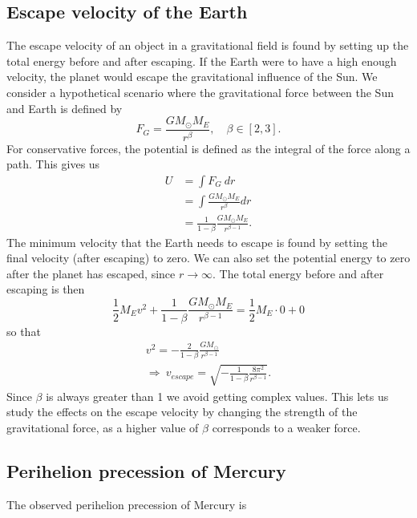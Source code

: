 \documentclass{emulateapj}
\begin{document}
\subsection{Escape velocity of the Earth}

The escape velocity of an object in a gravitational field is found by setting up the total energy before and after escaping. If the Earth were to have a high enough velocity, the planet would escape the gravitational influence of the Sun. We consider a hypothetical scenario where the gravitational force between the Sun and Earth is defined by
%
\begin{equation*}
    F_G = \frac{G M_\odot M_E}{r^\beta}, \quad \beta \in [2,3].
\end{equation*}
%
For conservative forces, the potential is defined as the integral of the force along a path. This gives us 
%
\begin{align*}
    U & = \int F_G \ dr \\
    & = \int \frac{G M_\odot M_E}{r^\beta} dr \\
    & = \frac{1}{1-\beta} \frac{G M_\odot M_E}{r^{\beta-1}}.
\end{align*}
%
The minimum velocity that the Earth needs to escape is found by setting the final velocity (after escaping) to zero. We can also set the potential energy to zero after the planet has escaped, since $r \rightarrow \infty$. The total energy before and after escaping is then 
%
\begin{equation*}
    \frac{1}{2}M_E v^2 + \frac{1}{1-\beta} \frac{G M_\odot M_E}{r^{\beta-1}} = \frac{1}{2}M_E \cdot 0 + 0
\end{equation*}
%
so that 
%
\begin{gather*}
    v^2 = -\frac{2}{1-\beta} \frac{G M_\odot}{r^{\beta-1}} \\
  \Rightarrow \ v_{escape} = \sqrt{ -\frac{1}{1 - \beta} \frac{8\pi^2}{r^{\beta - 1}} }.
\end{gather*}
%
Since $\beta$ is always greater than 1 we avoid getting complex values. This lets us study the effects on the escape velocity by changing the strength of the gravitational force, as a higher value of $\beta$ corresponds to a weaker force.

\subsection{Perihelion precession of Mercury}

The observed perihelion precession of Mercury is 
\end{document}

